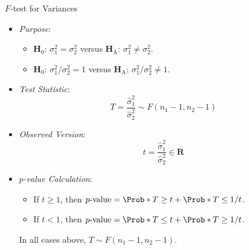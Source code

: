 \begin{Statistical_Test}{$ F $-test for Variances}{}
    \begin{itemize}
        \item \emph{Purpose}:
              \begin{itemize}
                  \item $ \mathbf{H}_0 $: $ \sigma_1^2=\sigma_2^2 $ versus $ \mathbf{H}_\text{A} $: $ \sigma_1^2\ne \sigma_2^2 $.
                  \item $ \mathbf{H}_0 $: $ \sigma_1^2/\sigma_2^2=1 $ versus $ \mathbf{H}_\text{A} $: $ \sigma_1^2/\sigma_2^2\ne 1 $.
              \end{itemize}
        \item \emph{Test Statistic}:
              \[ T=\frac{\hat{\sigma}_1^2}{\hat{\sigma}_2^2}\sim F(n_1-1,n_2-1)  \]
        \item \emph{Observed Version}:
              \[ t=\frac{\hat{\sigma}_1^2}{\hat{\sigma}_2^2}\in\mathbf{R}   \]
        \item \emph{$ p $-value Calculation}:
              \begin{itemize}
                  \item If $ t\ge 1 $, then $ p\text{-value}=\Prob*{T\ge t}+\Prob*{T\le 1/t} $.
                  \item If $ t<1 $, then $ p\text{-value}=\Prob*{T\le t}+\Prob*{T\ge 1/t} $.
              \end{itemize}
              \begin{Remark}{}{}
                  In all cases above, $ T \sim F(n_1-1,n_2-1) $.
              \end{Remark}
    \end{itemize}
\end{Statistical_Test}
